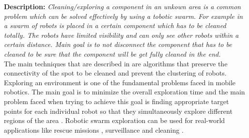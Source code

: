 
\textbf{Description: }
\emph{Cleaning/exploring a component in an unkown area is a common problem which can be solved effectively by using a tobotic swarm. For example in \cite{wagner2008cooperative} a swarm of robots is placed in a certain component which has to be cleaned totally. The robots have limited visibility and can only see other robots within a certain distance. Main goal is to not disconnect the component that has to be cleaned to be sure that the component will be get fully cleaned in the end.} \\
  The main techniques that are described in \cite{wagner2008cooperative} are algorithms that preserve the connectivity of the spot to be cleaned and prevent the clustering of robots.
Exploring an environment is one of the fundamental problems faced in mobile robotics. The main goal is to minimize the overall exploration time and the main problem faced when trying to achieve this goal is finding appropriate target points for each individual robot so that they simultaneously explore different regions of the area \cite{burgard2005coordinated}. Robotic swarm exploration can be used for real-world applications like rescue missions \cite{Naghsh2008,Penders2011}, surveillance \cite{Burkle2010} and cleaning \cite{wagner2008cooperative}.